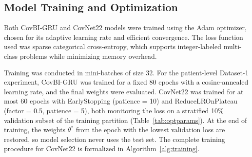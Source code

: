 \documentclass[a4paper,fleqn]{cas-sc}
\begin{document}
\begin{table}[!htbp]
\centering
\caption{Image Preprocessing Hyperparameters for Datasets 2, 3, and 4}
\label{tab:augparams}
\end{table}

\subsection{Model Training and Optimization}

Both CovBI-GRU and CovNet22 models were trained using the Adam optimizer, chosen for its adaptive learning rate and efficient convergence. The loss function used was sparse categorical cross-entropy, which supports integer-labeled multi-class problems while minimizing memory overhead.

Training was conducted in mini-batches of size 32. For the patient-level Dataset-1 experiment, CovBI-GRU was trained for a fixed 80 epochs with a cosine-annealed learning rate, and the final weights were evaluated. CovNet22 was trained for at most 60 epochs with EarlyStopping (patience = 10) and ReduceLROnPlateau (factor = 0.5, patience = 5), both monitoring the loss on a stratified 10\% validation subset of the training partition (Table~\ref{tab:optparams}). At the end of training, the weights $\theta^*$ from the epoch with the lowest validation loss are restored, so model selection never uses the test set. The complete training procedure for CovNet22 is formalized in Algorithm~\ref{alg:training}.
\end{document}
